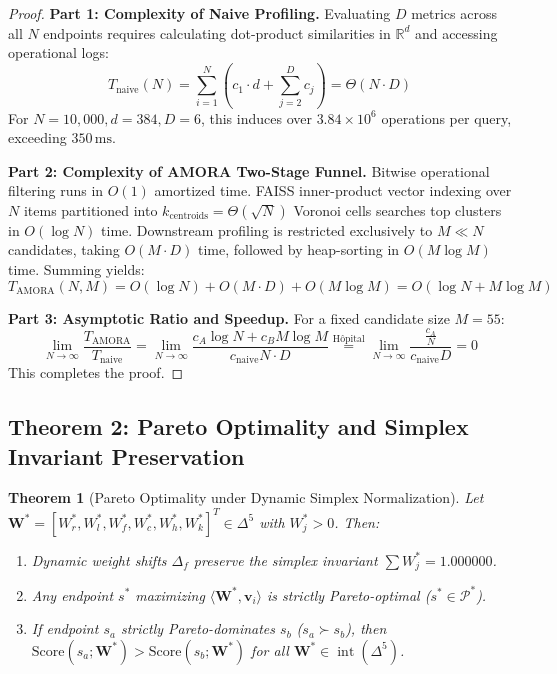 \documentclass[journal,10pt,twocolumn]{IEEEtran}
\newtheorem{theorem}{Theorem}
\begin{document}
\begin{proof}
\textbf{Part 1: Complexity of Naive Profiling.}
Evaluating $D$ metrics across all $N$ endpoints requires calculating dot-product similarities in $\mathbb{R}^d$ and accessing operational logs:
\begin{equation}
    T_{\text{naive}}(N) = \sum_{i=1}^N \left( c_1 \cdot d + \sum_{j=2}^D c_j \right) = \Theta(N \cdot D)
\end{equation}
For $N = 10,000, d = 384, D = 6$, this induces over $3.84 \times 10^6$ operations per query, exceeding $350\,\text{ms}$.

\textbf{Part 2: Complexity of AMORA Two-Stage Funnel.}
Bitwise operational filtering runs in $O(1)$ amortized time. FAISS inner-product vector indexing over $N$ items partitioned into $k_{\text{centroids}} = \Theta(\sqrt{N})$ Voronoi cells searches top clusters in $O(\log N)$ time. Downstream profiling is restricted exclusively to $M \ll N$ candidates, taking $O(M \cdot D)$ time, followed by heap-sorting in $O(M \log M)$ time. Summing yields:
\begin{equation}
    T_{\text{AMORA}}(N, M) = O(\log N) + O(M \cdot D) + O(M \log M) = O(\log N + M \log M)
\end{equation}

\textbf{Part 3: Asymptotic Ratio and Speedup.}
For a fixed candidate size $M = 55$:
\begin{equation}
    \lim_{N \to \infty} \frac{T_{\text{AMORA}}}{T_{\text{naive}}} = \lim_{N \to \infty} \frac{c_A \log N + c_B M \log M}{c_{\text{naive}} N \cdot D} \stackrel{\text{H\^{o}pital}}{=} \lim_{N \to \infty} \frac{\frac{c_A}{N}}{c_{\text{naive}} D} = 0
\end{equation}
This completes the proof.
\end{proof}

\subsection{Theorem 2: Pareto Optimality and Simplex Invariant Preservation}
\label{subsec:proof_pareto}

\begin{theorem}[Pareto Optimality under Dynamic Simplex Normalization]
Let $\mathbf{W}^* = [W_r^*, W_l^*, W_f^*, W_c^*, W_h^*, W_k^*]^T \in \Delta^5$ with $W_j^* > 0$. Then:
\begin{enumerate}
    \item Dynamic weight shifts $\Delta_f$ preserve the simplex invariant $\sum W_j^* = 1.000000$.
    \item Any endpoint $s^*$ maximizing $\langle \mathbf{W}^*, \mathbf{v}_i \rangle$ is strictly Pareto-optimal ($s^* \in \mathcal{P}^*$).
    \item If endpoint $s_a$ strictly Pareto-dominates $s_b$ ($s_a \succ s_b$), then $\text{Score}(s_a; \mathbf{W}^*) > \text{Score}(s_b; \mathbf{W}^*)$ for all $\mathbf{W}^* \in \operatorname{int}(\Delta^5)$.
\end{enumerate}
\end{theorem}
\end{document}
